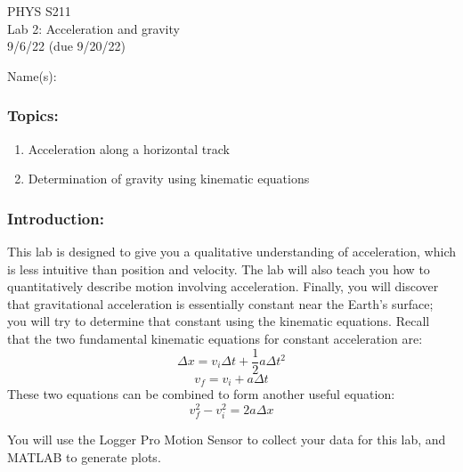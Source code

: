 \documentclass[11pt,letterpaper]{article}
\begin{document}
\setlength{\parindent}{0in}

\begin{flushright}
PHYS S211\\
Lab 2: Acceleration and gravity\\
9/6/22 (due 9/20/22)
\end{flushright}

Name(s):\\

\subsubsection*{Topics:}
\begin{enumerate}
\setlength{\parskip}{3pt}
\item Acceleration along a horizontal track
\item Determination of gravity using kinematic equations
\end{enumerate}

\subsubsection*{Introduction:}
This lab is designed to give you a qualitative understanding of acceleration, which is less intuitive than position and velocity. The lab will also teach you how to quantitatively describe motion involving acceleration. Finally, you will discover that gravitational acceleration is essentially constant near the Earth's surface; you will try to determine that constant using the kinematic equations. Recall that the two fundamental kinematic equations for constant acceleration are:
$$\Delta{x}=v_i\Delta{t}+\frac{1}{2}a\Delta{t}^2$$
$$v_f=v_i+a\Delta{t}$$
These two equations can be combined to form another useful equation:
$$v_f^2-v_i^2=2a\Delta{x}$$

You will use the Logger Pro Motion Sensor to collect your data for this lab, and MATLAB to generate plots.
\end{document}
